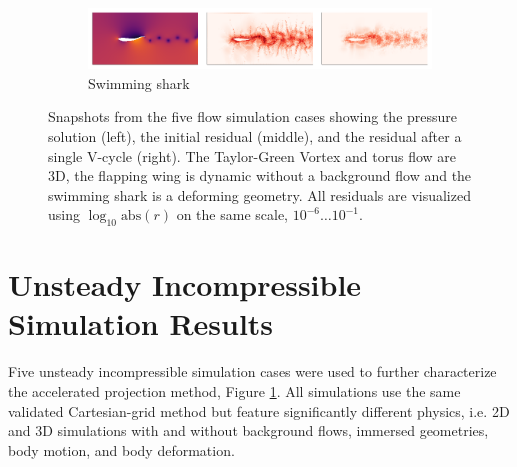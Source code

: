 \documentclass[review]{elsarticle}
\begin{document}
\begin{figure}
    \begin{subfigure}[b]{\textwidth}
        \centering
        \includegraphics[width=\textwidth]{figures/sharktriple.png}
        \caption{Swimming shark}
    \end{subfigure}
    \hfill
    \caption{Snapshots from the five flow simulation cases showing the pressure solution (left), the initial residual (middle), and the residual after a single V-cycle (right). The Taylor-Green Vortex and torus flow are 3D, the flapping wing is dynamic without a background flow and the swimming shark is a deforming geometry. All residuals are visualized using $\log_{10}\text{abs}(r)$ on the same scale, $10^{-6} \ldots 10^{-1}$.}
    \label{fig:simulation cases}
\end{figure}

\section{Unsteady Incompressible Simulation Results}

Five unsteady incompressible simulation cases were used to further characterize the accelerated projection method, Figure \ref{fig:simulation cases}. All simulations use the same validated Cartesian-grid method \cite{maertens2015accurate} but feature significantly different physics, i.e. 2D and 3D simulations with and without background flows, immersed geometries, body motion, and body deformation.
\end{document}
